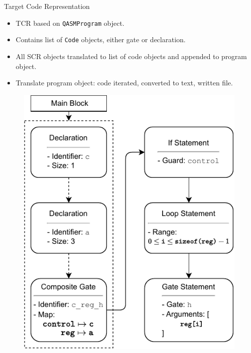 \begin{frame}{Target Code Representation}    
    \begin{minipage}{.38\textwidth}
        \begin{itemize}
            \item TCR based on \texttt{QASMProgram} object.
            \item Contains list of \texttt{Code} objects, either gate or declaration. 
            \item All SCR objects translated to list of code objects and appended to program object.
            \item Translate program object: code iterated, converted to text, written file. 
        \end{itemize}
    \end{minipage}    
    \begin{minipage}{.32\textwidth}
        \centering
        \begin{figure}[htp]
            \centering
            \includegraphics[width=\textwidth]{../figures/drawio/codeGen_sourceCode_example.pdf}

\end{figure}
\end{minipage}
\end{frame}
